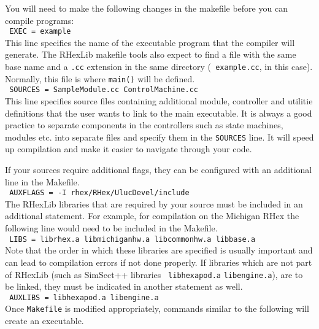 You will need to make the following changes in the makefile before you can
compile programs:\\

{\tt
\noindent EXEC = example
}\\

This line specifies the name of the executable program that the compiler
will generate. The RHexLib makefile tools also expect to find a file with
the same base name and a {\tt .cc} extension in the same directory ({\tt
  example.cc}, in this case). Normally, this file is where {\tt main()} will 
be defined.\\

{\tt
\noindent SOURCES = SampleModule.cc ControlMachine.cc
}\\

This line specifies source files containing additional module, controller
and utilitie definitions that the user wants to link to the main
executable. It is always a good practice to separate components in the
controllers such as state machines, modules etc. into separate files and
specify them in the {\tt SOURCES} line. It will speed up compilation and
make it easier to navigate through your code.

If your sources require additional flags, they can be configured with an
additional line in the Makefile.\\

{\tt
\noindent AUXFLAGS = -I~rhex/RHex/UlucDevel/include
}\\

The RHexLib libraries that are required by your source must be included in
an additional statement. For example, for compilation on the Michigan RHex
the following line would need to be included in the Makefile.\\

{\tt
\noindent LIBS = librhex.a libmichiganhw.a libcommonhw.a libbase.a
}\\

Note that the order in which these libraries are specified is usually
important and can lead to compilation errors if not done properly. If
libraries which are not part of RHexLib (such as SimSect++ libraries {\tt
  libhexapod.a} {\tt libengine.a}), are to be linked, they must be indicated
in another statement as well.\\

{\tt
\noindent AUXLIBS = libhexapod.a libengine.a
}\\

Once {\tt Makefile} is modified appropriately, commands similar to the
following will create an executable.\\


